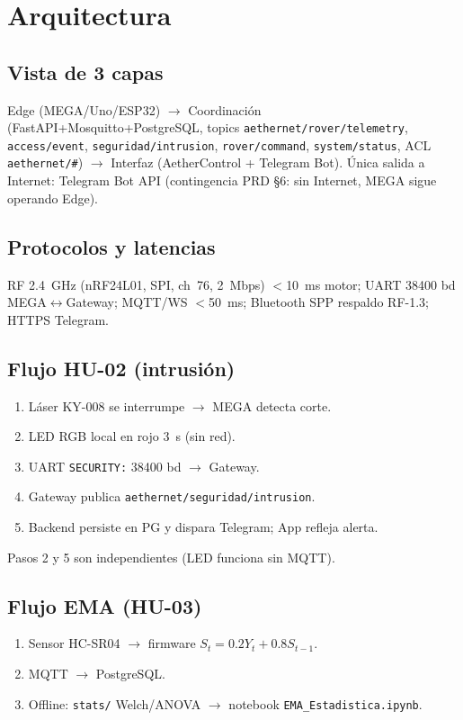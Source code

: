\documentclass[conference]{IEEEtran}
\begin{document}
\section{Arquitectura}
\subsection{Vista de 3 capas}
Edge (MEGA/Uno/ESP32) $\rightarrow$ Coordinación (FastAPI+Mosquitto+PostgreSQL, topics \texttt{aethernet/rover/telemetry}, \texttt{access/event}, \texttt{seguridad/intrusion}, \texttt{rover/command}, \texttt{system/status}, ACL \texttt{aethernet/\#}) $\rightarrow$ Interfaz (AetherControl + Telegram Bot). Única salida a Internet: Telegram Bot API (contingencia PRD \S6: sin Internet, MEGA sigue operando Edge).

\subsection{Protocolos y latencias}
RF 2.4~GHz (nRF24L01, SPI, ch~76, 2~Mbps) $<$10~ms motor; UART 38400 bd MEGA$\leftrightarrow$Gateway; MQTT/WS $<$50~ms; Bluetooth SPP respaldo RF-1.3; HTTPS Telegram.

\subsection{Flujo HU-02 (intrusión)}
\begin{enumerate}
\item Láser KY-008 se interrumpe $\rightarrow$ MEGA detecta corte.
\item LED RGB local en rojo 3~s (sin red).
\item UART \texttt{SECURITY:} 38400 bd $\rightarrow$ Gateway.
\item Gateway publica \texttt{aethernet/seguridad/intrusion}.
\item Backend persiste en PG y dispara Telegram; App refleja alerta.
\end{enumerate}
Pasos 2 y 5 son independientes (LED funciona sin MQTT).

\subsection{Flujo EMA (HU-03)}
\begin{enumerate}
\item Sensor HC-SR04 $\rightarrow$ firmware $S_t=0.2Y_t+0.8S_{t-1}$.
\item MQTT $\rightarrow$ PostgreSQL.
\item Offline: \texttt{stats/} Welch/ANOVA $\rightarrow$ notebook \texttt{EMA\_Estadistica.ipynb}.
\end{enumerate}
\end{document}

